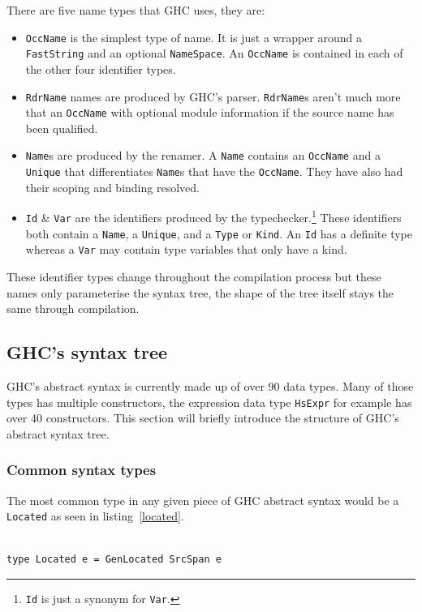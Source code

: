 There are five name types that GHC uses, they are:

\begin{itemize}
	\item \texttt{OccName} is the simplest type of name. It is just a wrapper around a \texttt{FastString} and an optional \texttt{NameSpace}. An \texttt{OccName} is contained in each of the other four identifier types.
	\item \texttt{RdrName} names are produced by GHC's parser. \texttt{RdrName}s aren't much more that an \texttt{OccName} with optional module information if the source name has been qualified. 
	\item \texttt{Name}s are produced by the renamer. A \texttt{Name} contains an \texttt{OccName} and a \texttt{Unique} that differentiates \texttt{Name}s that have the \texttt{OccName}. They have also had their scoping and binding resolved.
	\item \texttt{Id} \& \texttt{Var} are the identifiers produced by the typechecker.\footnote{\texttt{Id} is just a synonym for \texttt{Var}.} These identifiers both contain a \texttt{Name}, a \texttt{Unique}, and a \texttt{Type} or \texttt{Kind}. An \texttt{Id} has a definite type whereas a \texttt{Var} may contain type variables that only have a kind.   
\end{itemize}

These identifier types change throughout the compilation process but these names only parameterise the syntax tree, the shape of the tree itself stays the same through compilation. 

\subsection{GHC's syntax tree}
GHC's abstract syntax is currently made up of over 90 data types. Many of those types has multiple constructors, the expression data type \texttt{HsExpr} for example has over 40 constructors. This section will briefly introduce the structure of GHC's abstract syntax tree.

\subsubsection{Common syntax types}

The most common type in any given piece of GHC abstract syntax would be a \texttt{Located} as seen in listing~\ref{located}.

\begin{lstlisting}[caption={The \texttt{located} type.},label=located]

type Located e = GenLocated SrcSpan e

\end{lstlisting}

